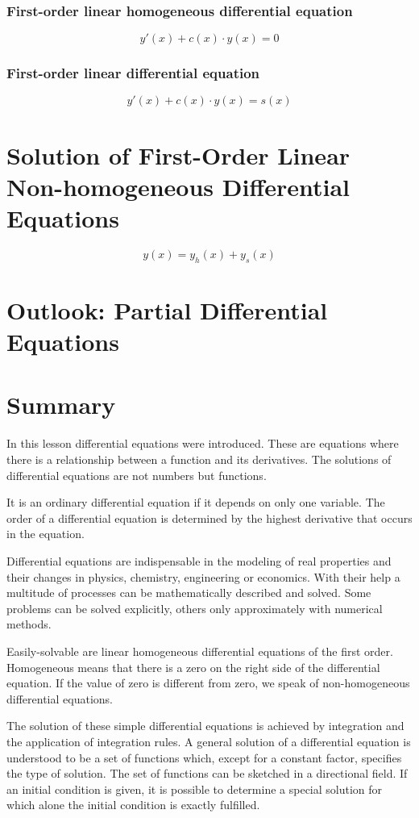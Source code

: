 \documentclass{book}
\begin{document}
\subsubsection{First-order linear homogeneous differential equation}
\[
  y'(x) + c(x) \cdot y(x) = 0
\]

\subsubsection{First-order linear differential equation}
\[
  y'(x) + c(x) \cdot y(x) = s(x)
\]

\section{Solution of First-Order Linear Non-homogeneous Differential Equations}

\[
  y(x) = y_h(x) + y_s(x)
\]

\section{Outlook: Partial Differential Equations}

\section{Summary}

In this lesson differential equations were introduced. These are equations where there is a relationship between a function and its derivatives. The solutions of differential equations are not numbers but functions.

It is an ordinary differential equation if it depends on only one variable. The order of a differential equation is determined by the highest derivative that occurs in the equation.

Differential equations are indispensable in the modeling of real properties and their changes in physics, chemistry, engineering or economics. With their help a multitude of processes can be mathematically described and solved. Some problems can be solved explicitly, others only approximately with numerical methods.

Easily-solvable are linear homogeneous differential equations of the first order. Homogeneous means that there is a zero on the right side of the differential equation. If the value of zero is different from zero, we speak of non-homogeneous differential equations.

The solution of these simple differential equations is achieved by integration and the application of integration rules. A general solution of a differential equation is understood to be a set of functions which, except for a constant factor, specifies the type of solution. The set of functions can be sketched in a directional field. If an initial condition is given, it is possible to determine a special solution for which alone the initial condition is exactly fulfilled.
\end{document}
